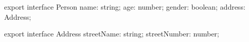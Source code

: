 \begin{typescript}
export interface Person {
    name: string;
    age: number;
    gender: boolean;
    address: Address;
}

export interface Address {
    streetName: string;
    streetNumber: number;
}
\end{typescript}